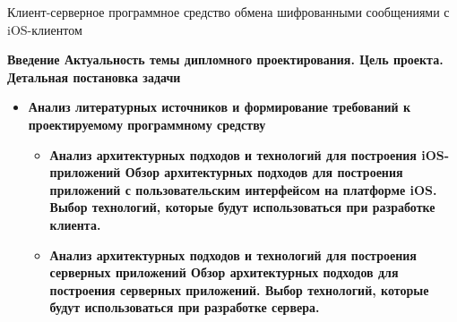 \label{sec:prospect}

\centerline{Клиент-серверное программное средство обмена шифрованными сообщениями с iOS-клиентом}

\bf{Введение}
Актуальность темы дипломного проектирования. Цель проекта. Детальная постановка задачи

\begin{itemize}
\item \bf{Анализ литературных источников и формирование требований к проектируемому программному средству}
	\begin{itemize}
	\item \bf{Анализ архитектурных подходов и технологий для построения iOS-приложений}
	Обзор архитектурных подходов для построения приложений с пользовательским интерфейсом на платформе iOS. Выбор технологий, которые будут использоваться при разработке клиента.
	\item \bf{Анализ архитектурных подходов и технологий для построения серверных приложений}
	Обзор архитектурных подходов для построения серверных приложений. Выбор технологий, которые будут использоваться при разработке сервера.
	\end{itemize}
\end{itemize}
